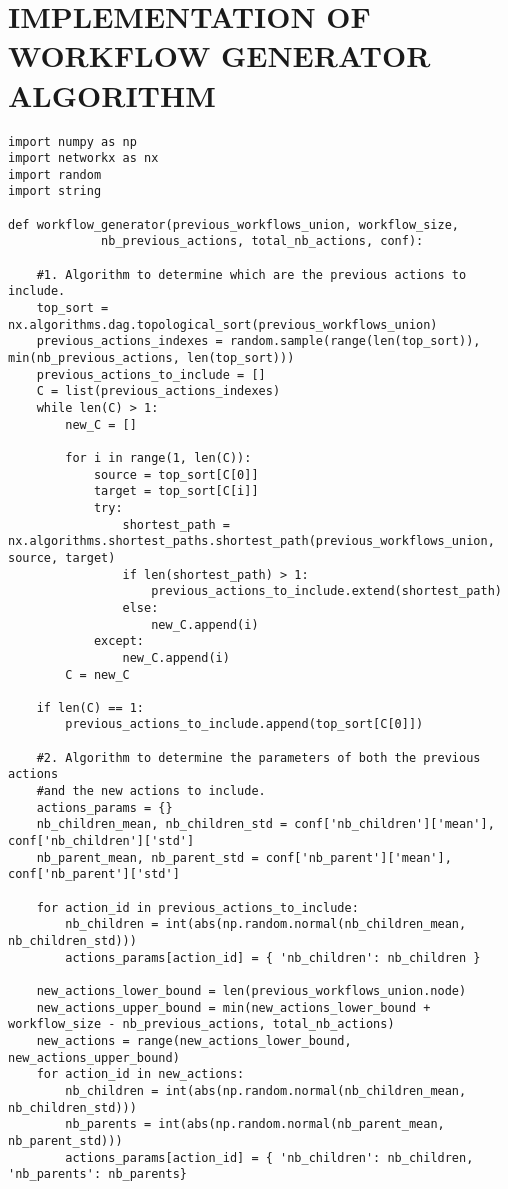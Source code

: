 \chapter{IMPLEMENTATION OF WORKFLOW GENERATOR ALGORITHM}
\label{app:workflow_generator_implementation}
\begin{singlespace}
\begin{lstlisting}
import numpy as np
import networkx as nx
import random
import string

def workflow_generator(previous_workflows_union, workflow_size,
             nb_previous_actions, total_nb_actions, conf):
           
    #1. Algorithm to determine which are the previous actions to include.
    top_sort = nx.algorithms.dag.topological_sort(previous_workflows_union)
    previous_actions_indexes = random.sample(range(len(top_sort)), min(nb_previous_actions, len(top_sort)))
    previous_actions_to_include = []
    C = list(previous_actions_indexes)
    while len(C) > 1:
        new_C = []
        
        for i in range(1, len(C)):
            source = top_sort[C[0]]
            target = top_sort[C[i]]
            try:
                shortest_path = nx.algorithms.shortest_paths.shortest_path(previous_workflows_union, source, target)
                if len(shortest_path) > 1:
                    previous_actions_to_include.extend(shortest_path)
                else:
                    new_C.append(i)
            except:
                new_C.append(i)
        C = new_C
    
    if len(C) == 1:
        previous_actions_to_include.append(top_sort[C[0]])
    
    #2. Algorithm to determine the parameters of both the previous actions
    #and the new actions to include.
    actions_params = {}
    nb_children_mean, nb_children_std = conf['nb_children']['mean'], conf['nb_children']['std']
    nb_parent_mean, nb_parent_std = conf['nb_parent']['mean'], conf['nb_parent']['std']
    
    for action_id in previous_actions_to_include:
        nb_children = int(abs(np.random.normal(nb_children_mean, nb_children_std)))
        actions_params[action_id] = { 'nb_children': nb_children }
    
    new_actions_lower_bound = len(previous_workflows_union.node)
    new_actions_upper_bound = min(new_actions_lower_bound + workflow_size - nb_previous_actions, total_nb_actions)
    new_actions = range(new_actions_lower_bound, new_actions_upper_bound)
    for action_id in new_actions:
        nb_children = int(abs(np.random.normal(nb_children_mean, nb_children_std)))
        nb_parents = int(abs(np.random.normal(nb_parent_mean, nb_parent_std)))
        actions_params[action_id] = { 'nb_children': nb_children, 'nb_parents': nb_parents}
        

\end{lstlisting}
\end{singlespace}
